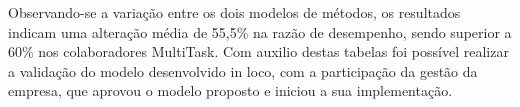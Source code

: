 Observando-se a variação entre os dois modelos de métodos, os resultados indicam uma alteração média de 55,5\% na razão de desempenho, sendo superior a 60\% nos colaboradores MultiTask. Com auxilio destas tabelas foi possível realizar a validação do modelo desenvolvido in loco, com a participação da gestão da empresa, que aprovou o modelo proposto e iniciou a sua implementação.



%
%
%

